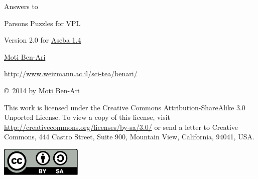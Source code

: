 \documentclass[11pt,a4paper,english]{report}
\begin{document}
\thispagestyle{empty}

\begin{center}
\begin{Huge}
\begin{bfseries}
Answers to

\bigskip

Parsons Puzzles for VPL
\end{bfseries}
\end{Huge}

\bigskip
\bigskip

\begin{Large}
Version 2.0
for \href{https://aseba.wikidot.com/en:downloadinstall}{Aseba 1.4}
\end{Large}


\bigskip
\bigskip
\bigskip
\bigskip
\bigskip

\begin{LARGE}
\href{http://www.weizmann.ac.il/sci-tea/benari/}{Moti Ben-Ari}
\end{LARGE}

\begin{Large}
\href{http://www.weizmann.ac.il/sci-tea/benari/}{http://www.weizmann.ac.il/sci-tea/benari/}
\end{Large}

\end{center}

\vfill

\begin{center}
\copyright{}\  2014 by \href{http://www.weizmann.ac.il/sci-tea/benari/}{Moti Ben-Ari}%
\end{center}

This work is licensed under the Creative Commons
Attribution-ShareAlike 3.0 Unported License. To view a copy
of this license, visit
\url{http://creativecommons.org/licenses/by-sa/3.0/}
or send a letter to Creative Commons, 444 Castro Street, Suite 900,
Mountain View, California, 94041, USA.

\begin{center}
\includegraphics[width=.2\textwidth]{by-sa}
\end{center}

\newpage
\thispagestyle{empty}
\setcounter{page}{1}

\end{document}
